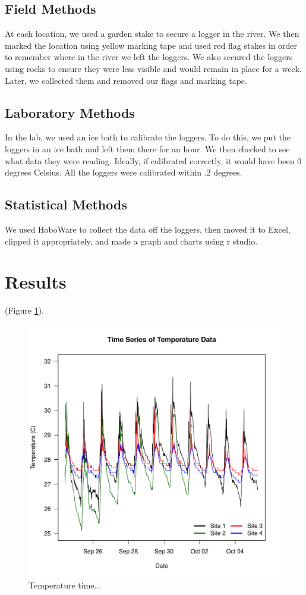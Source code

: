 \documentclass{article}
\begin{document}
\subsection{Field Methods} 
At each location, we used a garden stake to secure a logger in the river. We then marked the location using yellow marking tape and used red flag stakes in order to remember where in the river we left the loggers. We also secured the loggers using rocks to ensure they were less visible and would remain in place for a week. Later, we collected them and removed our flags and marking tape. 

\subsection{Laboratory Methods}
In the lab, we used an ice bath to calibrate the loggers. To do this, we put the loggers in an ice bath and left them there for an hour. We then checked to see what data they were reading. Ideally, if calibrated correctly, it would have been 0 degrees Celsius. All the loggers were calibrated within .2 degrees.

\subsection{Statistical Methods}
We used HoboWare to collect the data off the loggers, then moved it to Excel, clipped it appropriately, and made a graph and charts using r studio. 

\section{Results}

(Figure \ref{Temp}).

\begin{figure}
\includegraphics{Figures/Temp}
\caption{Temperature time...}
\label{Temp}
\end{figure}
\end{document}
